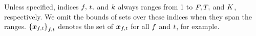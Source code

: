 \documentclass[sip,biber]{now-journal}
\begin{document}
Unless specified, indices $f,\, t,$ and $k$ always ranges from 1 to $F, T,$ and $K$, respectively.
We omit the bounds of sets over these indices when they span the ranges.
${\{\Obs _{\ft}\}}_{\ft}$ denotes the set of $\Obs _{\ft}$ for all $f$ and $t$, for example.
\end{document}
